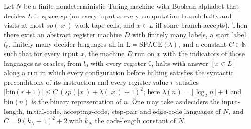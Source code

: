 \begin{theorem}
\label{Complexity.LogProg.SavitchARM.deepen_contract}
\leanok
{}
Let $N$ be a finite nondeterministic Turing machine with Boolean alphabet that decides $L$ in space $\mathit{sp}$ (on every input $x$ every computation branch halts and visits at most $\mathit{sp}(|x|)$ work-tape cells, and $x\in L$ iff some branch accepts). Then there
exist an abstract register machine $D$ with finitely many labels, a start label $l_0$, finitely many
decider languages all in $\mathrm{L}=\mathrm{SPACE}(\lambda)$, and a constant $C\in\mathbb{N}$
such that for every input $x$, the machine $D$ run on $x$ with the indicators of those languages as
oracles, from $l_0$ with every register $0$, halts with answer $[x\in L]$ along a run in which every
configuration before halting satisfies the syntactic preconditions of its instruction and every
register value $r$ satisfies $|\mathrm{bin}(r+1)|\le C\,(\mathit{sp}(|x|)+\lambda(|x|)+1)^2$;
here $\lambda(n)=\lfloor\log_2 n\rfloor+1$ and $\mathrm{bin}(n)$ is the binary representation of
$n$. One may take as deciders the input-length, initial-code, accepting-code, step-pair and edge-code
languages of $N$, and $C=9(k_N+1)^2+2$ with $k_N$ the code-length constant of $N$.
\end{theorem}
